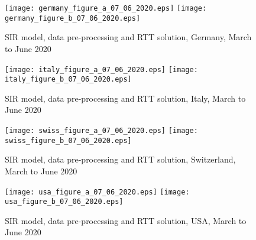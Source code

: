 \documentclass{article}
\begin{document}
\begin{figure}
\begin{center}
{\texttt{[image: germany\_figure\_a\_07\_06\_2020.eps]}}
\qquad
{\texttt{[image: germany\_figure\_b\_07\_06\_2020.eps]}}
\end{center}
\begin{center}
\caption{SIR model, data pre-processing and RTT solution, Germany, March to June 2020
}
\label{fig:germany_sir_model_07_06_2020}
\end{center}
\end{figure}

\begin{figure}
\begin{center}
{\texttt{[image: italy\_figure\_a\_07\_06\_2020.eps]}}
\qquad
{\texttt{[image: italy\_figure\_b\_07\_06\_2020.eps]}}
\end{center}
\begin{center}
\caption{SIR model, data pre-processing and RTT solution, Italy, March to June 2020
}
\label{fig:italy_sir_model_07_06_2020}
\end{center}
\end{figure}

\begin{figure}
\begin{center}
{\texttt{[image: swiss\_figure\_a\_07\_06\_2020.eps]}}
\qquad
{\texttt{[image: swiss\_figure\_b\_07\_06\_2020.eps]}}
\end{center}
\begin{center}
\caption{SIR model, data pre-processing and RTT solution, Switzerland, March to June 2020
}
\label{fig:swiss_sir_model_07_06_2020}
\end{center}
\end{figure}

\begin{figure}
\begin{center}
{\texttt{[image: usa\_figure\_a\_07\_06\_2020.eps]}}
\qquad
{\texttt{[image: usa\_figure\_b\_07\_06\_2020.eps]}}
\end{center}
\begin{center}
\caption{SIR model, data pre-processing and RTT solution, USA, March to June 2020
}
\label{fig:usa_sir_model_07_06_2020}
\end{center}
\end{figure}
\end{document}
